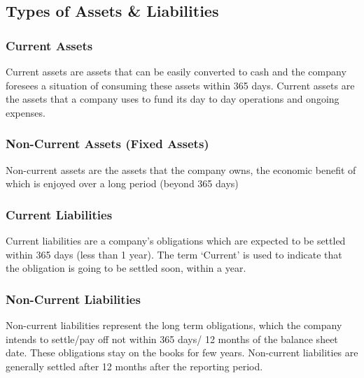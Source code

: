 


\subsection{Types of Assets \& Liabilities}
\subsubsection{Current Assets}
Current assets are assets that can be easily converted to cash and the company foresees a situation of consuming these assets within 365 days. Current assets are the assets that a company uses to fund its day to day operations and ongoing expenses.
\subsubsection{Non-Current Assets (Fixed Assets)}
Non-current assets are the assets that the company owns, the economic benefit of which is enjoyed over a long period (beyond 365 days)
\subsubsection{Current Liabilities}
Current liabilities are a company’s obligations which are expected to be settled within 365 days (less than 1 year). The term ‘Current’ is used to indicate that the obligation is going to be settled soon, within a year.
\subsubsection{Non-Current Liabilities}
Non-current liabilities represent the long term obligations, which the company intends to settle/pay off not within 365 days/ 12 months of the balance sheet date. These obligations stay on the books for few years. Non-current liabilities are generally settled after 12 months after the reporting period.

